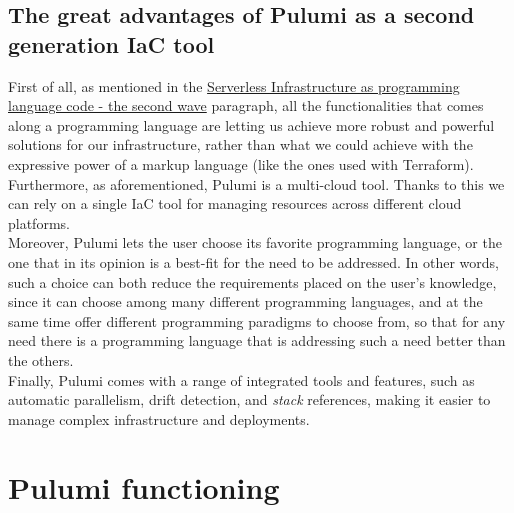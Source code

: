 \subsection{The great advantages of Pulumi as a second generation IaC tool}
First of all, as mentioned in the \hyperref[sssec:second-wave]{Serverless Infrastructure as programming language code - the second wave} paragraph, all the functionalities that comes along a programming language are letting us achieve more robust and powerful solutions for our infrastructure, rather than what we could achieve with the expressive power of a markup language (like the ones used with \gls{Terraform}).\\
Furthermore, as aforementioned, Pulumi is a multi-cloud tool. Thanks to this we can rely on a single IaC tool for managing resources across different cloud platforms.\\
Moreover, Pulumi lets the user choose its favorite programming language, or the one that in its opinion is a best-fit for the need to be addressed.
In other words, such a choice can both reduce the requirements placed on the user's knowledge, since it can choose among many different programming languages, 
and at the same time offer different programming paradigms to choose from, so that for any need there is a programming language that is addressing such a need better than the others.\\
Finally, Pulumi comes with a range of integrated tools and features, such as automatic parallelism, drift detection, and \textit{stack} references, making it easier to manage complex infrastructure and deployments.

\section{Pulumi functioning}
\label{sec:pulumi-functioning}

